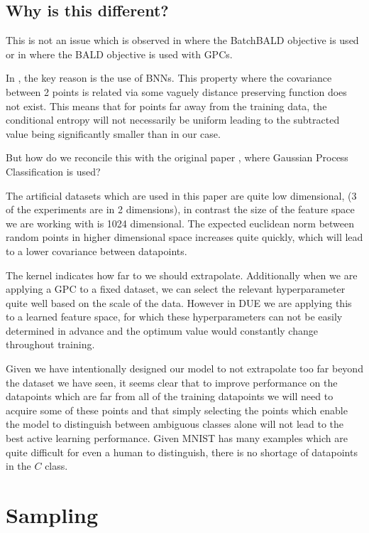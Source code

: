 \documentclass[12pt, a4paper]{report}
\theoremstyle{definition}
\theoremstyle{definition}
\theoremstyle{definition}
\begin{document}
\subsection{Why is this different?}

This is not an issue which is observed in \cite{kirsch2019batchbald} where the BatchBALD objective is used or in \cite{houlsby2011bayesian} where the BALD objective is used with GPCs. 

In \cite{kirsch2019batchbald}, the key reason is the use of BNNs. This property where the covariance between 2 points is related via some vaguely distance preserving function does not exist. This means that for points far away from the training data, the conditional entropy will not necessarily be uniform leading to the subtracted value being significantly smaller than in our case.

But how do we reconcile this with the original paper \cite{houlsby2011bayesian}, where Gaussian Process Classification is used?


The artificial datasets which are used in this paper are quite low dimensional, (3 of the experiments are in 2 dimensions), in contrast the size of the feature space we are working with is 1024 dimensional. The expected euclidean norm between random points in higher dimensional space increases quite quickly, which will lead to a lower covariance between datapoints.

The kernel indicates how far to we should extrapolate. Additionally when we are applying a GPC to a fixed dataset, we can select the relevant hyperparameter quite well based on the scale of the data. However in DUE we are applying this to a learned feature space, for which these hyperparameters can not be easily determined in advance and the optimum value would constantly change throughout training.


Given we have intentionally designed our model to not extrapolate too far beyond the dataset we have seen, it seems clear that to improve performance on the datapoints which are far from all of the training datapoints we will need to acquire some of these points and that simply selecting the points which enable the model to distinguish between ambiguous classes alone will not lead to the best active learning performance. Given MNIST has many examples which are quite difficult for even a human to distinguish, there is no shortage of datapoints in the $C$ class.


\section{Sampling}
\end{document}
